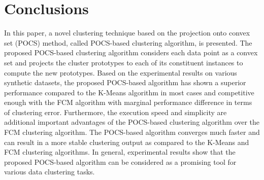 \documentclass[conference]{IEEEtran}
\begin{document}


\section{Conclusions}

In this paper, a novel clustering technique based on the projection onto convex set (POCS) method, called POCS-based clustering algorithm, is presented. The proposed POCS-based clustering algorithm considers each data point as a convex set and projects the cluster prototypes to each of its constituent instances to compute the new prototypes. Based on the experimental results on various synthetic datasets, the proposed POCS-based algorithm has shown a superior performance compared to the K-Means algorithm in most cases and competitive enough with the FCM algorithm with marginal performance difference in terms of clustering error. Furthermore, the execution speed and simplicity are additional important advantages of the POCS-based clustering algorithm over the FCM clustering algorithm. The POCS-based algorithm converges much faster and can result in a more stable clustering output as compared to the K-Means and FCM clustering algorithms. In general, experimental results show that the proposed POCS-based algorithm can be considered as a promising tool for various data clustering tasks.


\end{document}
